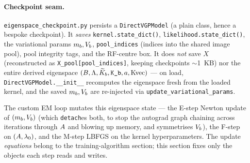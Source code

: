 \paragraph{Checkpoint seam.}
\texttt{eigenspace\_checkpoint.py} persists a \texttt{DirectVGPModel} (a plain
class, hence a bespoke checkpoint). It \emph{saves}
\texttt{kernel.state\_dict()}, \texttt{likelihood.state\_dict()}, the variational
params $m_{b},V_{b}$, \texttt{pool\_indices} (indices into the shared image pool),
pool integrity tags, and the RF-centre box. It does \emph{not} save $X$
(reconstructed as \texttt{X\_pool[pool\_indices]}, keeping checkpoints $\sim$1~KB)
nor the entire derived eigenspace $(B,\Lambda,\widetilde{K}_{b},\texttt{K\_b},a,\mathrm{Kvec})$
--- on load, \texttt{DirectVGPModel.\_\_init\_\_} recomputes the eigenspace fresh
from the loaded kernel, and the saved $m_{b},V_{b}$ are re-injected via
\texttt{update\_variational\_params}.


\begin{remark}
The custom EM loop mutates this eigenspace state --- the E-step Newton update of
$(m_{b},V_{b})$ (which \texttt{detach}es both, to stop the autograd graph chaining
across iterations through $A$ and blowing up memory, and symmetrises $V_{b}$),
the F-step on $(A,\lambda_{0})$, and the M-step LBFGS on the kernel
hyperparameters. The update \emph{equations} belong to the training-algorithm
section; this section fixes only the objects each step reads and writes.
\end{remark}

\endgroup  %
